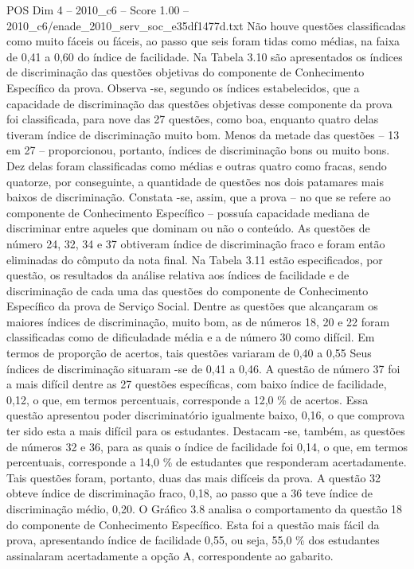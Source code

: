\begin{textsample}{POS Dim 4 – 2010\_c6 – Score 1.00 – 2010\_c6/enade\_2010\_serv\_soc\_e35df1477d.txt}
Não houve questões classificadas como muito fáceis ou fáceis, ao passo que seis foram tidas como médias, na faixa de 0,41 a 0,60 do índice de facilidade.
Na Tabela 3.10 são apresentados os índices de discriminação das questões objetivas do componente de Conhecimento Específico da prova.
Observa -se, segundo os índices estabelecidos, que a capacidade de discriminação das questões objetivas desse componente da prova foi classificada, para nove das 27 questões, como boa, enquanto quatro delas tiveram índice de discriminação muito bom.
Menos da metade das questões – 13 em 27 – proporcionou, portanto, índices de discriminação bons ou muito bons.
Dez delas foram classificadas como médias e outras quatro como fracas, sendo quatorze, por conseguinte, a quantidade de questões nos dois patamares mais baixos de discriminação.
Constata -se, assim, que a prova – no que se refere ao componente de Conhecimento Específico – possuía capacidade mediana de discriminar entre aqueles que dominam ou não o conteúdo.
As questões de número 24, 32, 34 e 37 obtiveram índice de discriminação fraco e foram então eliminadas do cômputo da nota final.
Na Tabela 3.11 estão especificados, por questão, os resultados da análise relativa aos índices de facilidade e de discriminação de cada uma das questões do componente de Conhecimento Específico da prova de Serviço Social.
Dentre as questões que alcançaram os maiores índices de discriminação, muito bom, as de números 18, 20 e 22 foram classificadas como de dificuladade média e a de número 30 como difícil.
Em termos de proporção de acertos, tais questões variaram de 0,40 a 0,55 Seus índices de discriminação situaram -se de 0,41 a 0,46.
A questão de número 37 foi a mais difícil dentre as 27 questões específicas, com baixo índice de facilidade, 0,12, o que, em termos percentuais, corresponde a 12,0 \% de acertos.
Essa questão apresentou poder discriminatório igualmente baixo, 0,16, o que comprova ter sido esta a mais difícil para os estudantes.
Destacam -se, também, as questões de números 32 e 36, para as quais o índice de facilidade foi 0,14, o que, em termos percentuais, corresponde a 14,0 \% de estudantes que responderam acertadamente.
Tais questões foram, portanto, duas das mais difíceis da prova.
A questão 32 obteve índice de discriminação fraco, 0,18, ao passo que a 36 teve índice de discriminação médio, 0,20.
O Gráfico 3.8 analisa o comportamento da questão 18 do componente de Conhecimento Específico.
Esta foi a questão mais fácil da prova, apresentando índice de facilidade 0,55, ou seja, 55,0 \% dos estudantes assinalaram acertadamente a opção A, correspondente ao gabarito.

\end{textsample}
